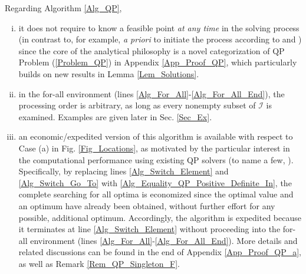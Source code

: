 \documentclass{imaman}
\newcommand{\calI}{{\mathcal I}}
\numberwithin{equation}{section}
\begin{document}
\begin{remark} Regarding Algorithm \ref{Alg_QP},
\begin{enumerate}[i)]
\item it does not require to know a feasible point \textit{at any time} in the solving process (in contrast to, for example, \textit{a priori} to initiate the process according to \cite{BoVa:04} and \cite{Lu(Ye):03(16)}) since the core of the analytical philosophy is a novel categorization of QP Problem (\ref{Problem_QP}) in Appendix \ref{App_Proof_QP}, which particularly builds on new results in Lemma \ref{Lem_Solutions}.
\item\label{Rem_Alg_Order_For_All} in the for-all environment (lines \ref{Alg_For_All}-\ref{Alg_For_All_End}), the processing order is arbitrary, as long as every nonempty subset of $\calI$ is examined. Examples are given later in Sec. \ref{Sec_Ex}.
\item an economic/expedited version of this algorithm is available with respect to Case (a) in Fig. \ref{Fig_Locations}, as motivated by the particular interest in the computational performance using existing QP solvers (to name a few, \cite{JoFo:13,RaLe:19}). Specifically, by replacing lines \ref{Alg_Switch_Element} and \ref{Alg_Switch_Go_To} with \ref{Alg_Equality_QP_Positive_Definite_In}, the complete searching for all optima is economized since the optimal value and an optimum have already been obtained, without further effort for any possible, additional optimum. Accordingly, the algorithm is expedited because it terminates at line \ref{Alg_Switch_Element} without proceeding into the for-all environment (lines \ref{Alg_For_All}-\ref{Alg_For_All_End}). More details and related discussions can be found in the end of Appendix \ref{App_Proof_QP_a}, as well as Remark \ref{Rem_QP_Singleton_F}.
\end{enumerate}
\label{Rem_Alg}
\end{remark}
\end{document}
